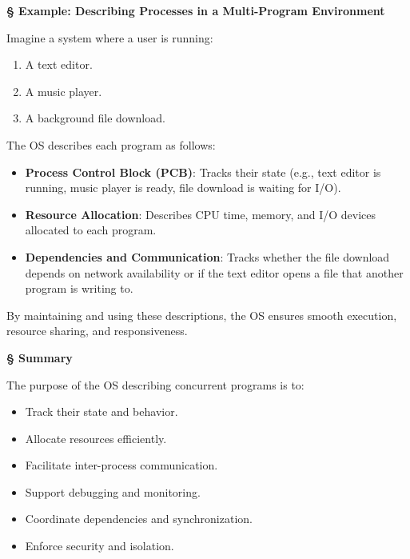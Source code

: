 \documentclass[a4paper]{book}
\newcommand{\sfbf}[1]{{\normalsize\textsf{\textbf{§ #1}}}}
\begin{document}
\sfbf{Example: Describing Processes in a Multi-Program Environment}

Imagine a system where a user is running:
\begin{enumerate}
\item 
A text editor.

\item 
A music player.

\item 
A background file download.

\end{enumerate}

The OS describes each program as follows:
\begin{itemize}
\item 
\textbf{Process Control Block (PCB)}: Tracks their state (e.g., text editor is running, music player is ready, file download is waiting for I/O).

\item 
\textbf{Resource Allocation}: Describes CPU time, memory, and I/O devices allocated to each program.

\item 
\textbf{Dependencies and Communication}: Tracks whether the file download depends on network availability or if the text editor opens a file that another program is writing to.

\end{itemize}

By maintaining and using these descriptions, the OS ensures smooth execution, resource sharing, and responsiveness.

\hrulefill

\sfbf{Summary}

The purpose of the OS describing concurrent programs is to:
\begin{itemize}
\item 
Track their state and behavior.

\item 
Allocate resources efficiently.

\item 
Facilitate inter-process communication.

\item 
Support debugging and monitoring.

\item 
Coordinate dependencies and synchronization.

\item 
Enforce security and isolation.

\end{itemize}
\end{document}
